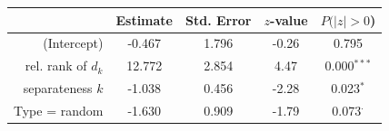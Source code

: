 \begin{tabular*}{.95\textwidth}{r @{\extracolsep{\fill}} 
		 S[table-format=2.3,table-comparator=false]
		 S[table-format=1.3,table-comparator=false]
 		 S[table-format=1.2,table-comparator=false]
 		 S[table-format=1.3,table-comparator=false]
		}
	\toprule
	& {Estimate} & {Std. Error} & {$z$-value} & {$P(|z|>0$)} \\ 
	\midrule
	(Intercept) & -0.467 & 1.796 & -0.26 & 0.795 \\ 
	rel. rank of $d_k$ & 12.772 & 2.854 & 4.47 & 0.000$^{***}$ \\ 
	separateness $k$ & -1.038 & 0.456 & -2.28 & 0.023$^{*}$ \\ 
	Type = random & -1.630 & 0.909 & -1.79 & 0.073$^{\cdot}$ \\ 
	\bottomrule
\end{tabular*}